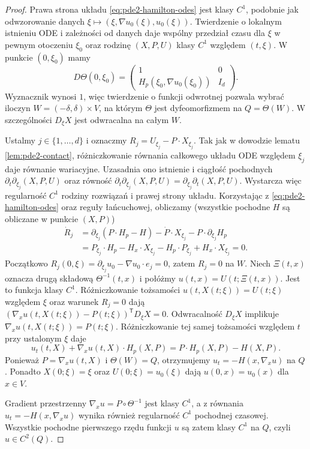 \begin{proof}
Prawa strona układu \eqref{eq:pde2-hamilton-odes}
jest klasy $C^1$, podobnie jak odwzorowanie danych
$\xi\mapsto(\xi,\nabla u_0(\xi),u_0(\xi))$.
Twierdzenie o lokalnym istnieniu ODE i zależności od
danych daje wspólny przedział czasu dla $\xi$
w pewnym otoczeniu $\xi_0$ oraz rodzinę $(X,P,U)$
klasy $C^1$ względem $(t,\xi)$.
W punkcie $(0,\xi_0)$ mamy
\[
 D\Theta(0,\xi_0)=
 \begin{pmatrix}
 1&0\\ H_p(\xi_0,\nabla u_0(\xi_0))&I_d
 \end{pmatrix}.
\]
Wyznacznik wynosi $1$, więc twierdzenie o funkcji
odwrotnej pozwala wybrać iloczyn
$W=(-\delta,\delta)\times V$, na którym $\Theta$ jest
dyfeomorfizmem na $Q=\Theta(W)$. W szczególności
$D_\xi X$ jest odwracalna na całym $W$.

Ustalmy $j\in\{1,\ldots,d\}$ i oznaczmy
$R_j=U_{\xi_j}-P\cdot X_{\xi_j}$.
Tak jak w dowodzie lematu \ref{lem:pde2-contact},
różniczkowanie równania całkowego układu ODE względem
$\xi_j$ daje równanie wariacyjne. Uzasadnia ono
istnienie i ciągłość pochodnych
$\partial_t\partial_{\xi_j}(X,P,U)$ oraz równość
$\partial_t\partial_{\xi_j}(X,P,U)
=\partial_{\xi_j}\partial_t(X,P,U)$.
Wystarcza więc regularność $C^1$ rodziny rozwiązań
i prawej strony układu.
Korzystając z \eqref{eq:pde2-hamilton-odes}
oraz reguły łańcuchowej, obliczamy (wszystkie
pochodne $H$ są obliczane w punkcie $(X,P)$)
\begin{align*}
 \dot R_j&=\partial_{\xi_j}(P\cdot H_p-H)
 -\dot P\cdot X_{\xi_j}-P\cdot\partial_{\xi_j}H_p\\
 &=P_{\xi_j}\cdot H_p-H_x\cdot X_{\xi_j}
 -H_p\cdot P_{\xi_j}+H_x\cdot X_{\xi_j}=0.
\end{align*}
Początkowo
$R_j(0,\xi)=\partial_{\xi_j}u_0-\nabla u_0\cdot e_j=0$,
zatem $R_j=0$ na $W$. Niech $\Xi(t,x)$ oznacza
drugą składową $\Theta^{-1}(t,x)$ i połóżmy
$u(t,x)=U(t;\Xi(t,x))$. Jest to funkcja klasy $C^1$.
Różniczkowanie tożsamości $u(t,X(t;\xi))=U(t;\xi)$
względem $\xi$ oraz warunek $R_j=0$ dają
$(\nabla_xu(t,X(t;\xi))-P(t;\xi))^\mathsf{T}D_\xi X=0$.
Odwracalność $D_\xi X$ implikuje
$\nabla_xu(t,X(t;\xi))=P(t;\xi)$.
Różniczkowanie tej samej tożsamości względem $t$
przy ustalonym $\xi$ daje
\[
 u_t(t,X)+\nabla_xu(t,X)\cdot H_p(X,P)
 =P\cdot H_p(X,P)-H(X,P).
\]
Ponieważ $P=\nabla_xu(t,X)$ i $\Theta(W)=Q$,
otrzymujemy $u_t=-H(x,\nabla_xu)$ na $Q$.
Ponadto $X(0;\xi)=\xi$ oraz $U(0;\xi)=u_0(\xi)$
dają $u(0,x)=u_0(x)$ dla $x\in V$.

Gradient przestrzenny $\nabla_xu=P\circ\Theta^{-1}$
jest klasy $C^1$, a z równania
$u_t=-H(x,\nabla_xu)$ wynika również regularność $C^1$
pochodnej czasowej. Wszystkie pochodne pierwszego
rzędu funkcji $u$ są zatem klasy $C^1$ na $Q$,
czyli $u\in C^2(Q)$.
\end{proof}

